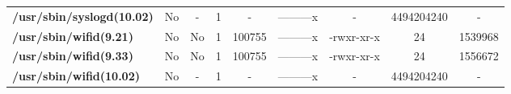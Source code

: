 \begin{center}
{\begin{tabular}{|>{\bfseries} l | C | C | C | C | C | C | C | C |}
					/usr/sbin/syslogd(10.02) & No & - & 1 & - & ---------x & - & 4494204240 & -\\ 
					/usr/sbin/wifid(9.21) & No & No & \color{green}1 & \color{red}100755 & \color{green}---------x & \color{red}-rwxr-xr-x & \color{green}24 & \color{red}1539968\\ 
					/usr/sbin/wifid(9.33) & No & No & \color{green}1 & \color{red}100755 & \color{green}---------x & \color{red}-rwxr-xr-x & \color{green}24 & \color{red}1556672\\ 
					/usr/sbin/wifid(10.02) & No & - & 1 & - & ---------x & - & 4494204240 & -\\ 

			\end{tabular}
		}
	\end{center}



